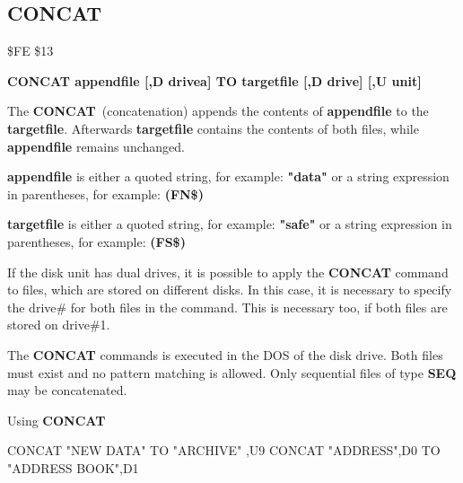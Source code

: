 \subsection{CONCAT}
\begin{description}[leftmargin=3cm,style=nextline]
\item [Token:] \$FE \$13
\item [Format:] {\bf CONCAT appendfile [,D drivea] TO
                targetfile [,D drive] [,U unit] }
\item [Usage:]
   The {\bf CONCAT} (concatenation) appends the contents of
   {\bf appendfile} to the {\bf targetfile}. Afterwards {\bf targetfile}
   contains the contents of both files, while {\bf appendfile}
   remains unchanged.

   {\bf appendfile} is either a quoted string, for example: {\bf "data"} or
   a string expression in parentheses, for example: {\bf (FN\$)}

   {\bf targetfile} is either a quoted string, for example: {\bf "safe"} or
   a string expression in parentheses, for example: {\bf (FS\$)}

   If the disk unit has dual drives, it is possible to apply
   the {\bf CONCAT} command to files, which are stored on different
   disks. In this case, it is necessary to specify the drive\#
   for both files in the command. This is necessary too, if both
   files are stored on drive\#1.

   \drivedefinition

   \unitdefinition

\item [Remarks:]
   The {\bf CONCAT} commands is executed in the DOS of the disk drive.
   Both files must exist and no pattern matching is allowed.
   Only sequential files of type {\bf SEQ} may be concatenated.

\item [Example:] Using {\bf CONCAT}
\begin{screenoutput}
  CONCAT "NEW DATA" TO "ARCHIVE" ,U9
  CONCAT "ADDRESS",D0 TO "ADDRESS BOOK",D1
\end{screenoutput}
\end{description}


\newpage
